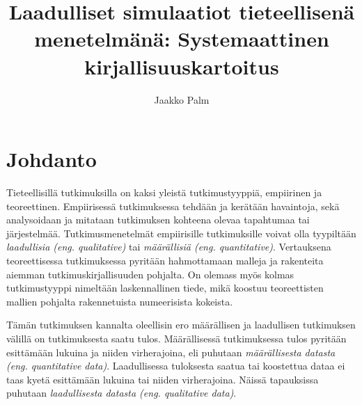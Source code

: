 \documentclass[utf8]{gradu3}
\begin{document}
\title{Laadulliset simulaatiot tieteellisenä menetelmänä: Systemaattinen kirjallisuuskartoitus}
\abstract{%
  
}

\author{Jaakko Palm}

\maketitle

\mainmatter

\chapter{Johdanto} \label{johdanto}
Tieteellisillä tutkimuksilla on kaksi yleistä tutkimustyyppiä, empiirinen ja teoreettinen.
Empiirisessä tutkimuksessa tehdään  ja kerätään havaintoja, sekä analysoidaan 
ja mitataan tutkimuksen kohteena olevaa tapahtumaa tai järjestelmää. 
Tutkimusmenetelmät empiirisille tutkimuksille voivat olla 
tyypiltään \textit{laadullisia (eng. qualitative)} 
tai \textit{määrällisiä (eng. quantitative)}. 
Vertauksena teoreettisessa tutkimuksessa pyritään hahmottamaan 
malleja ja rakenteita aiemman tutkimuskirjallisuuden pohjalta. 
On olemass myös kolmas tutkimustyyppi nimeltään laskennallinen tiede, 
mikä koostuu teoreettisten mallien pohjalta rakennetuista numeerisista kokeista. 

Tämän tutkimuksen kannalta oleellisin ero määrällisen ja laadullisen tutkimuksen 
välillä on tutkimuksesta saatu tulos.
Määrällisessä tutkimuksessa tulos pyritään esittämään lukuina ja niiden virherajoina,
eli puhutaan \textit{määrällisesta datasta (eng. quantitative data)}. 
Laadullisessa tuloksesta saatua tai koostettua dataa ei taas kyetä esittämään 
lukuina tai niiden virherajoina. Näissä tapauksissa puhutaan 
\textit{laadullisesta datasta (eng. qualitative data)}.
\end{document}
